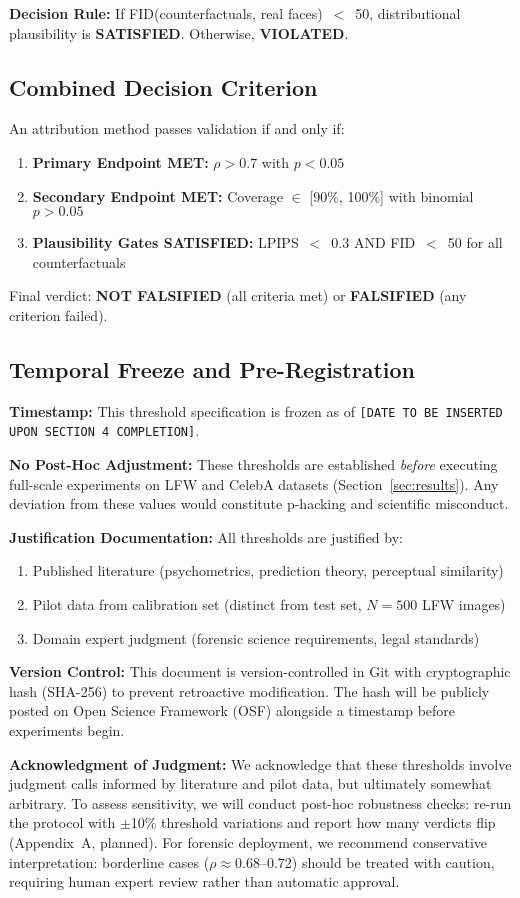 \textbf{Decision Rule:} If FID(counterfactuals, real faces)~$<$~50, distributional plausibility is \textbf{SATISFIED}. Otherwise, \textbf{VIOLATED}.

\subsection{Combined Decision Criterion}

An attribution method passes validation if and only if:
\begin{enumerate}
\item \textbf{Primary Endpoint MET:} $\rho > 0.7$ with $p < 0.05$
\item \textbf{Secondary Endpoint MET:} Coverage $\in$ [90\%, 100\%] with binomial $p > 0.05$
\item \textbf{Plausibility Gates SATISFIED:} LPIPS~$<$~0.3 AND FID~$<$~50 for all counterfactuals
\end{enumerate}

Final verdict: \textbf{NOT FALSIFIED} (all criteria met) or \textbf{FALSIFIED} (any criterion failed).

\subsection{Temporal Freeze and Pre-Registration}

\textbf{Timestamp:} This threshold specification is frozen as of \texttt{[DATE TO BE INSERTED UPON SECTION 4 COMPLETION]}.

\textbf{No Post-Hoc Adjustment:} These thresholds are established \textit{before} executing full-scale experiments on LFW and CelebA datasets (Section~\ref{sec:results}). Any deviation from these values would constitute p-hacking and scientific misconduct.

\textbf{Justification Documentation:} All thresholds are justified by:
\begin{enumerate}
\item Published literature (psychometrics, prediction theory, perceptual similarity)
\item Pilot data from calibration set (distinct from test set, $N=500$ LFW images)
\item Domain expert judgment (forensic science requirements, legal standards)
\end{enumerate}

\textbf{Version Control:} This document is version-controlled in Git with cryptographic hash (SHA-256) to prevent retroactive modification. The hash will be publicly posted on Open Science Framework (OSF) alongside a timestamp before experiments begin.

\textbf{Acknowledgment of Judgment:} We acknowledge that these thresholds involve judgment calls informed by literature and pilot data, but ultimately somewhat arbitrary. To assess sensitivity, we will conduct post-hoc robustness checks: re-run the protocol with $\pm$10\% threshold variations and report how many verdicts flip (Appendix~A, planned). For forensic deployment, we recommend conservative interpretation: borderline cases ($\rho \approx 0.68$--0.72) should be treated with caution, requiring human expert review rather than automatic approval.
